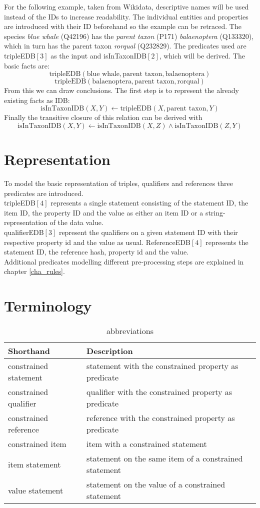\documentclass[hyperref,bachelorofscience,fleqn]{cgvpub}
\begin{document}
For the following example, taken from Wikidata, descriptive names will be used instead of the IDs to increase readability. The individual entities and properties are introduced with their ID beforehand so the example can be retraced. The species \emph{blue whale} (Q42196) has the \emph{parent taxon} (P171) \emph{balaenoptera} (Q133320), which in turn has the parent taxon \emph{rorqual} (Q232829). The predicates used are tripleEDB\([3]\) as the input and isInTaxonIDB\([2]\), which will be derived. The basic facts are:
\[\text{tripleEDB}(\text{blue whale}, \text{parent taxon}, \text{balaenoptera})\]
\[\text{tripleEDB}(\text{balaenoptera}, \text{parent taxon}, \text{rorqual})\]
From this we can draw conclusions. The first step is to represent the already existing facts as IDB:
\[\text{isInTaxonIDB}(X, Y) \leftarrow \text{tripleEDB}(X, \text{parent taxon}, Y)\]
Finally the transitive closure of this relation can be derived with
\[\text{isInTaxonIDB}(X, Y) \leftarrow \text{isInTaxonIDB}(X, Z) \wedge \text{isInTaxonIDB}(Z, Y)\]

\section{Representation}
To model the basic representation of triples, qualifiers and references three predicates are introduced.\\
tripleEDB\([4]\) represents a single statement consisting of the statement ID, the item ID, the property ID and the value as either an item ID or a string-representation of the data value.\\
qualifierEDB\([3]\) represent the qualifiers on a given statement ID with their respective property id and the value as usual. ReferenceEDB\([4]\) represents the statement ID, the reference hash, property id and the value.\\

Additional predicates modelling different pre-processing steps are explained in chapter \ref{cha_rules}.
\section{Terminology}
\begin{table}[H]
\caption{abbreviations}
\begin{tabular}{ll}
Shorthand & Description \\
\hline
constrained statement & statement with the constrained property as predicate \\
constrained qualifier & qualifier with the constrained property as predicate \\
constrained reference & reference with the constrained property as predicate \\
constrained item & item with a constrained statement \\
item statement & statement on the same item of a constrained statement \\
value statement & statement on the value of a constrained statement
\end{tabular}
\end{table}
\end{document}
